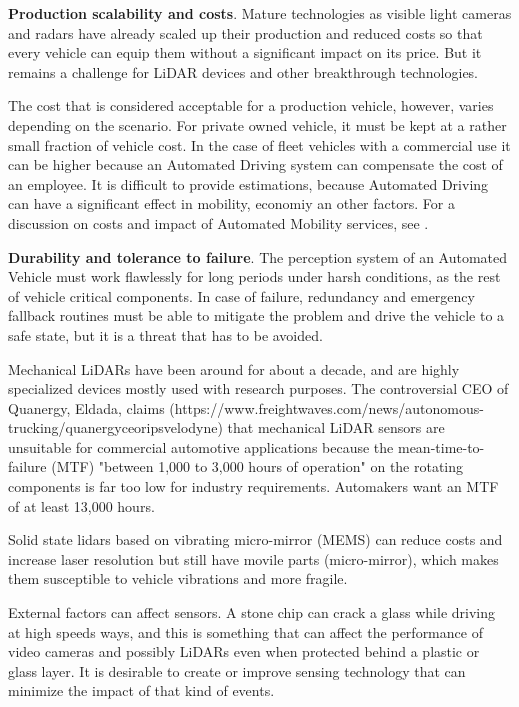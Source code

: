 \textbf{Production scalability and costs}. 
Mature technologies as visible light cameras and radars have already scaled up 
their production and reduced costs so that every vehicle can equip them without
a significant impact on its price. But it remains a challenge for LiDAR devices
and other breakthrough technologies.

The cost that is considered acceptable for a production vehicle, however, 
varies depending on the scenario. For private owned vehicle, it must be kept at
a rather small fraction of vehicle cost. In the case of fleet vehicles with a 
commercial use it can be higher because an Automated Driving system can 
compensate the cost of an employee.
It is difficult to provide estimations, because Automated Driving can have a 
significant effect in mobility, economiy an other factors. For a discussion
on costs and impact of Automated Mobility services, see \cite{Bosch2018}.

\textbf{Durability and tolerance to failure}.
The perception system of an Automated Vehicle must work flawlessly for long
periods under harsh conditions, as the rest of vehicle critical components. 
In case of failure, redundancy and emergency fallback routines must be able to 
mitigate the problem and drive the vehicle to a safe state, but it is a 
threat that has to be avoided.

Mechanical LiDARs have been around for about a decade, and are highly 
specialized devices mostly used with research purposes.
The controversial CEO of Quanergy, Eldada, claims 
(https://www.freightwaves.com/news/autonomous-trucking/quanergyceoripsvelodyne)
that mechanical LiDAR sensors are unsuitable for commercial 
automotive applications because the mean-time-to-failure (MTF)
"between 1,000 to 3,000 hours of operation" on the rotating 
components is far too low for industry requirements. Automakers want an MTF
of at least 13,000 hours.

Solid state lidars based on vibrating micro-mirror (MEMS) can reduce costs and increase laser resolution but 
still have movile parts (micro-mirror), which makes them susceptible to vehicle vibrations and more fragile.

External factors can affect sensors. A stone chip can crack a glass while 
driving at high speeds ways, and this is something that can affect the 
performance of video cameras and possibly LiDARs even when protected behind
a plastic or glass layer. It is desirable to create or improve sensing 
technology that can minimize the impact of that kind of events.

